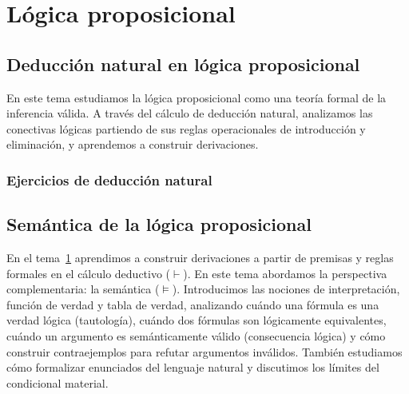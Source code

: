 \documentclass[spanish,11pt,a4paper,openany]{book}
\begin{document}
\mainmatter

\part{Lógica proposicional}

\chapter{Deducción natural en lógica proposicional}\label{cap:dn-prop}
\begin{resumentema}
En este tema estudiamos la lógica proposicional como una teoría formal
de la inferencia válida. A través del cálculo de deducción natural,
analizamos las conectivas lógicas partiendo de sus reglas operacionales
de introducción y eliminación, y aprendemos a
construir derivaciones. 
\end{resumentema}



\section{Ejercicios de deducción natural}


\chapter{Semántica de la lógica proposicional}\label{cap:sem-prop}
\begin{resumentema}
En el tema~\ref{cap:dn-prop} aprendimos a construir derivaciones a partir de premisas
y reglas formales en el cálculo deductivo ($\vdash$). En este tema abordamos la perspectiva complementaria: la semántica ($\models$). Introducimos las nociones de interpretación, función de verdad y tabla de verdad, analizando cuándo una fórmula es una verdad lógica (tautología), cuándo dos fórmulas son lógicamente equivalentes, cuándo un argumento es semánticamente válido (consecuencia lógica) y cómo construir contraejemplos para refutar argumentos inválidos. También estudiamos cómo formalizar enunciados del lenguaje natural y discutimos los límites del condicional material.
\end{resumentema}


\end{document}
